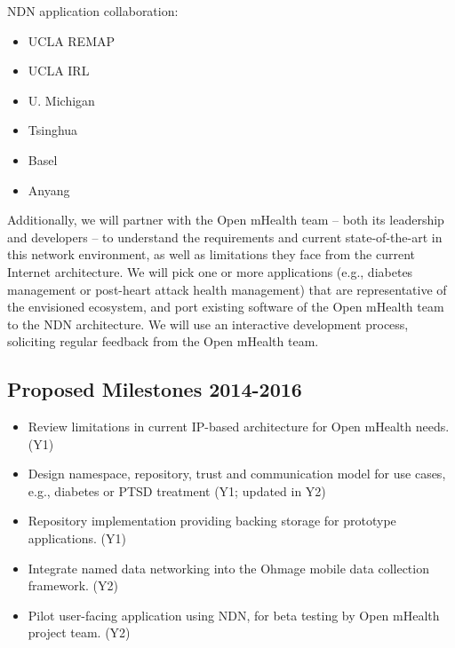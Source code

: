 NDN application collaboration:
\begin{itemize}
\item UCLA REMAP
\item UCLA IRL
\item U. Michigan
\item Tsinghua
\item Basel 
\item Anyang
\end{itemize}

Additionally, we will partner with the Open mHealth team -- both its leadership and
developers -- to understand the requirements and current state-of-the-art
in this network environment, as well as limitations they face from the
current Internet architecture. We will pick one or more 
applications (e.g., diabetes management or post-heart attack health management) 
that are representative of the envisioned ecosystem, and port existing software
of the Open mHealth team to the NDN architecture.  We will use an interactive
development process, soliciting regular feedback from the Open mHealth team.   


\subsection{Proposed Milestones 2014-2016}

\begin{itemize}
\item Review limitations in current IP-based architecture for Open mHealth needs. (Y1)
\item Design namespace, repository, trust and communication model for use cases, e.g., diabetes or PTSD treatment (Y1; updated in Y2)
\item Repository implementation providing backing storage for prototype applications. (Y1)
\item Integrate named data networking into the Ohmage mobile data collection framework. (Y2)
\item Pilot user-facing application using NDN, for beta testing by Open mHealth project team. (Y2)
\end{itemize}






